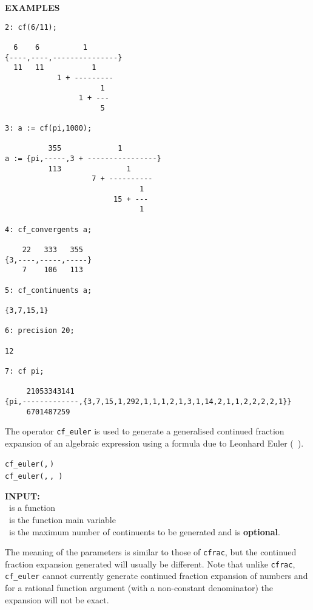 {\large\textbf{EXAMPLES}}
\begin{verbatim}
2: cf(6/11);

  6    6          1
{----,----,---------------}
  11   11           1
            1 + ---------
                      1
                 1 + ---
                      5

3: a := cf(pi,1000);

          355             1
a := {pi,-----,3 + ----------------}
          113               1
                    7 + ----------
                               1
                         15 + ---
                               1

4: cf_convergents a;

    22   333   355
{3,----,-----,-----}
    7    106   113

5: cf_continuents a;

{3,7,15,1}

6: precision 20;

12

7: cf pi;

     21053343141
{pi,-------------,{3,7,15,1,292,1,1,1,2,1,3,1,14,2,1,1,2,2,2,2,1}}
     6701487259
\end{verbatim}

\hypertarget{operator:CF_EULER}{}
The operator \texttt{cf\_euler} is used to generate a generalised
continued fraction expansion of an algebraic expression using a formula due to
Leonhard Euler (~\cite{Euler:1748}).
\begin{syntaxtable}
  \texttt{cf\_euler(}\texttt{,}\,\texttt{)}\\
  \texttt{cf\_euler(}\texttt{,}\,\texttt{,}\,%
    \texttt{)}
\end{syntaxtable}


\textbf{INPUT:}\\
\ is a function\\
 \ is the function main variable\\
 \ is the maximum number of continuents to be generated
and is \textbf{optional}.

The meaning of the parameters is similar to those of \texttt{cfrac}, but the
continued fraction expansion generated will usually be different. Note that
unlike \texttt{cfrac}, \texttt{cf\_euler} cannot currently generate
continued fraction expansion of numbers and for a rational function argument
(with a non-constant denominator) the expansion will not be exact.

